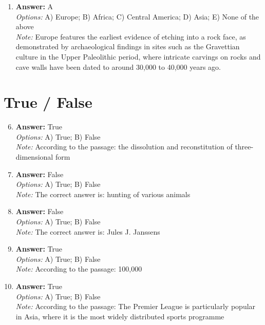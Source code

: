 \documentclass[12pt]{article}
\begin{document}
\begin{enumerate}[label=\arabic*.]
\\ \textit{Note:} The correct answer reflects the correlation between periods of severe drought, indicated by variations in oxygen isotopes, and the subsequent decline in construction activity at Maya ceremonial centers, highlighting the impact of environmental changes on societal developments.
\item \textbf{Answer:} A
\\ \textit{Options:} A) Europe; B) Africa; C) Central America; D) Asia; E) None of the above
\\ \textit{Note:} Europe features the earliest evidence of etching into a rock face, as demonstrated by archaeological findings in sites such as the Gravettian culture in the Upper Paleolithic period, where intricate carvings on rocks and cave walls have been dated to around 30,000 to 40,000 years ago.
\end{enumerate}

\section*{True / False}
\begin{enumerate}[label=\arabic*.]
\setcounter{enumi}{5}
\item \textbf{Answer:} True
\\ \textit{Options:} A) True; B) False
\\ \textit{Note:} According to the passage: the dissolution and reconstitution of three-dimensional form
\item \textbf{Answer:} False
\\ \textit{Options:} A) True; B) False
\\ \textit{Note:} The correct answer is: hunting of various animals
\item \textbf{Answer:} False
\\ \textit{Options:} A) True; B) False
\\ \textit{Note:} The correct answer is: Jules J. Janssens
\item \textbf{Answer:} True
\\ \textit{Options:} A) True; B) False
\\ \textit{Note:} According to the passage: 100,000
\item \textbf{Answer:} True
\\ \textit{Options:} A) True; B) False
\\ \textit{Note:} According to the passage: The Premier League is particularly popular in Asia, where it is the most widely distributed sports programme
\end{enumerate}
\end{document}
